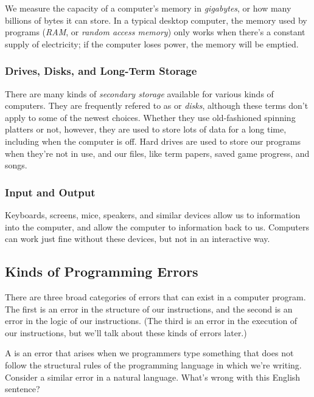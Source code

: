 We measure the capacity of a computer's memory in \textit{gigabytes}, or how many billions of bytes it can store.  In a typical desktop computer, the memory used by programs (\textit{RAM}, or \textit{random access memory}) only works when there's a constant supply of electricity; if the computer loses power, the memory will be emptied.

\subsubsection{Drives, Disks, and Long-Term Storage}
There are many kinds of \textit{secondary storage} available for various kinds of computers.  They are frequently refered to as  or \textit{disks}, although these terms don't apply to some of the newest choices.  Whether they use old-fashioned spinning platters or not, however, they are used to store lots of data for a long time, including when the computer is off.  Hard drives are used to store our programs when they're not in use, and our files, like term papers, saved game progress, and songs.

\subsubsection{Input and Output}
Keyboards, screens, mice, speakers, and similar devices allow us to  information into the computer, and allow the computer to  information back to us.  Computers can work just fine without these devices, but not in an interactive way.

\subsection{Kinds of Programming Errors}
\label{sec:kindsoferrors}

There are three broad categories of errors that can exist in a computer program.  The first is an error in the structure of our instructions, and the second is an error in the logic of our instructions.  (The third is an error in the execution of our instructions, but we'll talk about these kinds of errors later.)

A  is an error that arises when we programmers type something that does not follow the structural rules of the programming language in which we're writing.  Consider a similar error in a natural language.  What's wrong with this English sentence?

